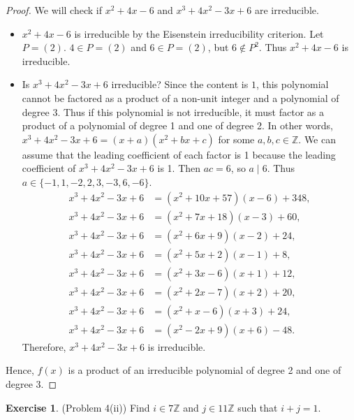 \documentclass[12pt, psamsfonts]{amsart}
\theoremstyle{definition}
\newtheorem*{exer}{Exercise}
\theoremstyle{remark}
\numberwithin{equation}{section}
\begin{document}
\begin{proof}
  We will check if $x^2 + 4x - 6$ and $x^3 + 4x^2 - 3x + 6$ are irreducible.
  \begin{itemize}
    \item
      $x^2 + 4x - 6$ is irreducible by the Eisenstein irreducibility criterion.
      Let $P = (2)$.
      $4 \in P = (2)$ and $6 \in P = (2)$, but $6 \notin P^2$.
      Thus $x^2 + 4x - 6$ is irreducible.
    \item
      Is $x^3 + 4x^2 - 3x + 6$ irreducible?
      Since the content is $1$, this polynomial cannot be factored as a product of a non-unit integer and a polynomial of degree 3.
      Thus if this polynomial is not irreducible, it must factor as a product of a polynomial of degree 1 and one of degree 2.
      In other words, $x^3 + 4x^2 - 3x + 6 = (x + a)(x^2 + bx + c)$ for some $a, b, c \in \mathbb{Z}$.
      We can assume that the leading coefficient of each factor is 1 because the leading coefficient of $x^3 + 4x^2 - 3x + 6$ is 1.
      Then $ac = 6$, so $a \mid 6$.
      Thus $a \in \{ -1, 1, -2, 2, 3, -3, 6, -6 \}$.
      \begin{align*}
        x^3 + 4x^2 - 3x + 6 &= (x^{2} + 10 x + 57)(x - 6) + 348, \\
        x^3 + 4x^2 - 3x + 6 &= (x^{2} + 7 x + 18)(x - 3) + 60, \\
        x^3 + 4x^2 - 3x + 6 &= (x^{2} + 6 x + 9)(x - 2) + 24, \\
        x^3 + 4x^2 - 3x + 6 &= (x^{2} + 5 x + 2)(x - 1) + 8, \\
        x^3 + 4x^2 - 3x + 6 &= (x^{2} + 3 x - 6)(x + 1) + 12, \\
        x^3 + 4x^2 - 3x + 6 &= (x^{2} + 2 x - 7)(x + 2) + 20, \\
        x^3 + 4x^2 - 3x + 6 &= (x^{2} + x - 6)(x + 3) + 24, \\
        x^3 + 4x^2 - 3x + 6 &= (x^{2} - 2 x + 9)(x + 6) - 48.
      \end{align*}
      Therefore, $x^3 + 4x^2 - 3x + 6$ is irreducible.
  \end{itemize}
  Hence, $f(x)$ is a product of an irreducible polynomial of degree 2 and one of degree 3.
\end{proof}

\begin{exer}{(Problem 4(ii))}
  Find $i \in 7\mathbb{Z}$ and $j \in 11\mathbb{Z}$ such that $i + j = 1$.
\end{exer}
\end{document}
